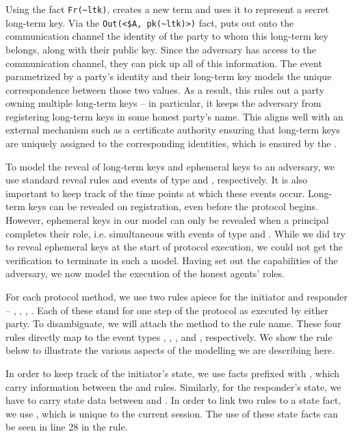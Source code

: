 Using the fact \verb|Fr(~ltk)|, \mTamarin{} creates a new term  and uses it to represent a secret long-term key.
%
Via the \verb|Out(<$A, pk(~ltk)>)| fact, \mTamarin{} puts out onto the communication channel the identity of the party to whom this long-term key belongs, along with their public key. 
%
Since the adversary has access to the communication channel, they can pick up all of this information.
%
The event  parametrized by a party's identity and their long-term key models the unique correspondence between those two values.
%
As a result, this rules out a party owning multiple long-term keys -- in particular, it keeps the adversary from registering long-term keys in some honest party's name.
%
This aligns well with an external mechanism such as a certificate authority ensuring that long-term keys are uniquely assigned to the corresponding identities, which is ensured by the \mSpec.

To model the reveal of long-term keys and ephemeral keys to an adversary, we use standard reveal rules and events of type \mRevLTK{} and \mRevEph, respectively. 
%
It is also important to keep track of the time points at which these events occur.
%
Long-term keys can be revealed on registration, even before the protocol begins.
%
However, ephemeral keys in our model can only be revealed when a principal completes their role, i.e. simultaneous with events of type \mIComplete{} and \mRComplete.
%
While we did try to reveal ephemeral keys at the start of protocol execution, we could not get the verification to terminate in such a model.
%
Having set out the capabilities of the adversary, we now model the execution of the honest agents' roles.

For each protocol method, we use two rules apiece for the initiator and responder -- , , , .
%
Each of these stand for one step of the protocol as executed by either party.
%
To disambiguate, we will attach the method to the rule name.
%
These four rules directly map to the event types \mIStart, \mRStart, \mIComplete, and \mRComplete, respectively.
%
We show the  rule below to illustrate the various aspects of the \mTamarin{} modelling we are describing here.

In order to keep track of the initiator's state, we use facts prefixed with , which carry information between the  and  rules.
%
Similarly, for the responder's state, we have  to carry state data between  and .
%
In order to link two rules to a state fact, we use , which is unique to the current session.
%
The use of these state facts can be seen in line 28 in the  rule.

